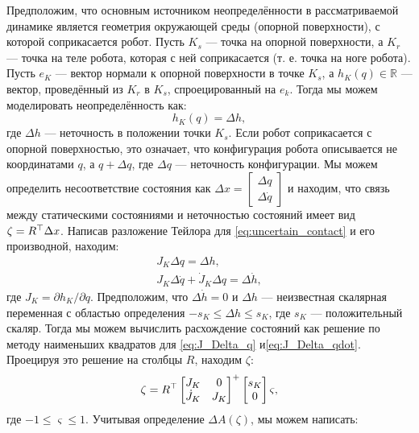 Предположим, что основным источником неопределённости в рассматриваемой динамике является геометрия окружающей среды (опорной поверхности), с которой соприкасается робот. Пусть $K_s$ --- точка на опорной поверхности, а $K_r$ --- точка на теле робота, которая с ней соприкасается (т. е. точка на ноге робота). Пусть $e_K$ --- вектор нормали к опорной поверхности в точке $K_s$, а $h_K(q) \in \mathbb{R}$ --- вектор, проведённый из $K_r$ в $K_s$, спроецированный на $e_k$. Тогда мы можем моделировать неопределённость как:
%
\begin{equation}
	\label{eq:uncertain_contact}
	h_K(q) = \Delta h,
\end{equation}
%
где $\Delta h$ --- неточность в положении точки $K_s$. Если робот соприкасается с опорной поверхностью, это означает, что конфигурация робота описывается не координатами $q$, а $q + \Delta q$, где $\Delta q$ --- неточность конфигурации. Мы можем определить несоответствие состояния как 
$\Delta x = \begin{bmatrix}
	\Delta q \\ \Delta \dot q
\end{bmatrix}$
и находим, что связь между статическими состояниями и неточностью состояний имеет вид $\zeta = {R}^\top \Delta x$. Написав разложение Тейлора для \eqref{eq:uncertain_contact} и его производной, находим:
%
\begin{align} 
	\label{eq:J_Delta_q} 
	{J}_K \Delta q = \Delta h,
	\\
	\label{eq:J_Delta_qdot} 
	{J}_K \Delta \dot q + \dot{{J}}_K \Delta q = \Delta \dot h,
\end{align}
%
где ${J}_K = \partial h_K / \partial q$.
Предположим, что $\Delta \dot h = 0$ и $\Delta h$ --- неизвестная скалярная переменная с областью определения $-s_K \leq \Delta h \leq s_K$, где $s_K$ --- положительный скаляр. Тогда мы можем вычислить расхождение состояний как решение по методу наименьших квадратов для \eqref{eq:J_Delta_q} и\eqref{eq:J_Delta_qdot}. Проецируя это решение на столбцы $R$, находим $\zeta$:
%
\begin{align}
	\zeta = {R}^\top 
	\begin{bmatrix}
		{J}_K & 0 \\ \dot{{J}}_K & {J}_K
	\end{bmatrix}^+ 
	\begin{bmatrix}
		s_K \\ 0
	\end{bmatrix} \varsigma,
\end{align}
%
где $-1 \leq \varsigma \leq 1$. Учитывая определение $\Delta {A}(\zeta)$, мы можем написать:

